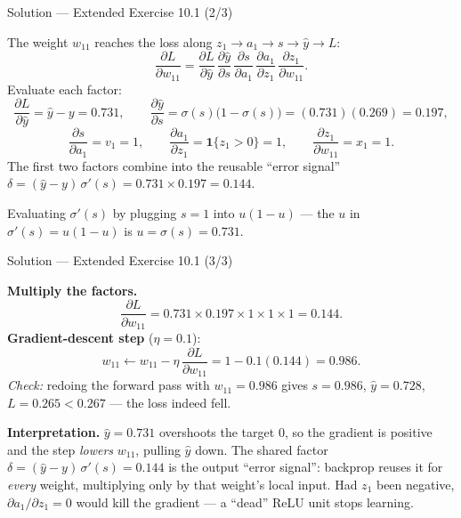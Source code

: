 \documentclass[aspectratio=169,11pt]{beamer}
\begin{document}
\begin{frame}{Solution --- Extended Exercise 10.1 (2/3)}
\begin{solutionbox}
  The weight $w_{11}$ reaches the loss along
  $z_1\!\to\!a_1\!\to\!s\!\to\!\hat y\!\to\!L$:
  \[
    \frac{\partial L}{\partial w_{11}}
    =\frac{\partial L}{\partial \hat y}\,
     \frac{\partial \hat y}{\partial s}\,
     \frac{\partial s}{\partial a_1}\,
     \frac{\partial a_1}{\partial z_1}\,
     \frac{\partial z_1}{\partial w_{11}} .
  \]
  Evaluate each factor:
  \[
    \frac{\partial L}{\partial \hat y}=\hat y-y=0.731,\qquad
    \frac{\partial \hat y}{\partial s}=\sigma(s)\big(1-\sigma(s)\big)=(0.731)(0.269)=0.197,
  \]
  \[
    \frac{\partial s}{\partial a_1}=v_1=1,\qquad
    \frac{\partial a_1}{\partial z_1}=\mathbf{1}\{z_1>0\}=1,\qquad
    \frac{\partial z_1}{\partial w_{11}}=x_1=1 .
  \]
  The first two factors combine into the reusable ``error signal''
  $\delta=(\hat y-y)\,\sigma'(s)=0.731\times0.197=0.144$.
\end{solutionbox}
\begin{mistake}
  Evaluating $\sigma'(s)$ by plugging $s=1$ into $u(1-u)$ --- the $u$ in
  $\sigma'(s)=u(1-u)$ is $u=\sigma(s)=0.731$.
\end{mistake}
\end{frame}

\begin{frame}{Solution --- Extended Exercise 10.1 (3/3)}
\begin{solutionbox}
  \textbf{Multiply the factors.}
  \[
    \frac{\partial L}{\partial w_{11}}
      =0.731\times0.197\times1\times1\times1=0.144 .
  \]
  \textbf{Gradient-descent step} ($\eta=0.1$):
  \[
    w_{11}\leftarrow w_{11}-\eta\,\frac{\partial L}{\partial w_{11}}
      =1-0.1(0.144)=0.986 .
  \]
  \emph{Check:} redoing the forward pass with $w_{11}=0.986$ gives
  $s=0.986$, $\hat y=0.728$, $L=0.265<0.267$ --- the loss indeed fell.

  \smallskip
  \textbf{Interpretation.} $\hat y=0.731$ overshoots the target $0$, so the gradient is
  positive and the step \emph{lowers} $w_{11}$, pulling $\hat y$ down. The shared factor
  $\delta=(\hat y-y)\,\sigma'(s)=0.144$ is the output ``error signal'': backprop reuses it
  for \emph{every} weight, multiplying only by that weight's local input. Had $z_1$ been
  negative, $\partial a_1/\partial z_1=0$ would kill the gradient --- a ``dead'' ReLU unit
  stops learning.
\end{solutionbox}
\end{frame}
\end{document}
